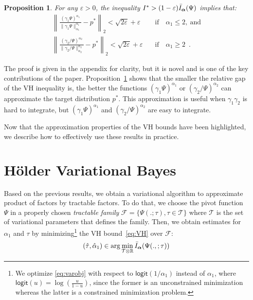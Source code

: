 \documentclass[reqno,oneside,letterpaper,10pt]{article}
\newcommand{\Holder}{H\"older\xspace}
\newcommand{\tauspace}{\mathcal{T}}
\def\proba{p}
\newcommand{\logit}{\mathsf{logit}}
\renewcommand{\Re}{\mathbb{R}}
\newtheorem{proposition}{Proposition}
\begin{document}
\begin{proposition}  
\label{th:approx}
For any $\varepsilon>0$, the inequality $I^* > (1-\varepsilon) \bar I_{\bm{\alpha}}(\Psi)$ implies that:
\begin{align}
\left\|
	\frac{(\gamma_1\Psi)^{\alpha_1}}{\|\gamma_1\Psi\|^{\alpha_1}_{\alpha_1}} 
	- 
	\proba^*
\right\|_2 < \sqrt{2\varepsilon} + \varepsilon
\quad &  \mathrm{if} \quad \alpha_1 \le 2, \mathrm{\ and}
\\
\left\|
	\frac{(\gamma_2/\Psi)^{\alpha_2}}{\|\gamma_2/\Psi\|^{\alpha_2}_{\alpha_2}} 
	- 
	\proba^*
\right\|_2 < \sqrt{2\varepsilon} + \varepsilon
\quad  & \mathrm{if} \quad \alpha_1 \ge 2
\enspace.
\end{align}
\end{proposition} 
The proof is given in the appendix for clarity, but it is novel and is one of the key contributions of the paper. 
Proposition~\ref{th:approx} shows that the smaller the relative gap of the VH inequality is, the better the functions $(\gamma_1 \Psi)^{\alpha_1}$ or $(\gamma_2/\Psi)^{\alpha_2}$ can approximate the target distribution $p^*$. This approximation is useful when $\gamma_1\gamma_2$ is hard to integrate, but $(\gamma_1 \Psi)^{\alpha_1}$ and $(\gamma_2/\Psi)^{\alpha_2}$ are easy to integrate.

Now that the approximation properties of the VH bounds have been highlighted, we describe how to effectively use these results in practice.


\section{\Holder Variational Bayes}
Based on the previous results, we obtain a variational algorithm to approximate product of factors by tractable factors.
To do that, we choose the pivot function $\Psi$ in a properly chosen \emph{tractable family} $\mathcal{F}=\{\Psi(.;\tau),\tau\in\tauspace\}$
 where $\tauspace$ is the set of variational parameters that defines the family.
Then, we obtain estimates for $\alpha_1$ and $\tau$ by minimizing\footnote{We optimize \eqref{eq:varobj} with respect to $\logit(1/\alpha_1)$ instead of $\alpha_1$, where $\logit(u)=\log(\frac{u}{1-u})$, since the former is an unconstrained minimization whereas the latter is a constrained minimization problem.}
 the VH bound~\eqref{eq:VH} over $\mathcal{F}$:
\begin{align}\label{eq:varobj}
  (\hat\tau,\hat\alpha_1) \in \arg\min_{\tauspace\otimes\Re} \bar I_\balpha(\Psi(.,;\tau))
\end{align}
\end{document}
